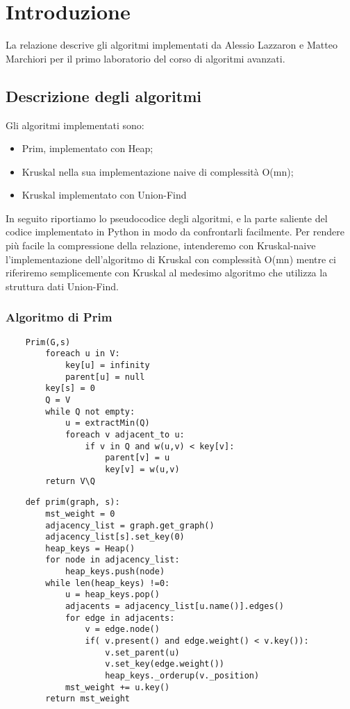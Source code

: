 \chapter{Introduzione\label{sec:introduzione}}
\noindent La relazione descrive gli algoritmi implementati da Alessio Lazzaron e Matteo Marchiori per il primo laboratorio del corso di algoritmi avanzati.

\section{Descrizione degli algoritmi\label{sec:descrizione}}
Gli algoritmi implementati sono:
\begin{itemize}
    \item Prim, implementato con Heap;
    \item Kruskal nella sua implementazione naive di complessità O(mn);
    \item Kruskal implementato con Union-Find
\end{itemize}

In seguito riportiamo lo pseudocodice degli algoritmi, e la parte saliente del codice implementato in Python in modo da confrontarli facilmente.
Per rendere più facile la compressione della relazione, intenderemo con Kruskal-naive l'implementazione dell'algoritmo di Kruskal con complessità O(mn) mentre ci riferiremo semplicemente con Kruskal al medesimo algoritmo che utilizza la struttura dati Union-Find.


\subsection{Algoritmo di Prim\label{sec:prim}}
\begin{verbatim}
    Prim(G,s)
        foreach u in V:
            key[u] = infinity
            parent[u] = null
        key[s] = 0
        Q = V
        while Q not empty:
            u = extractMin(Q)
            foreach v adjacent_to u:
                if v in Q and w(u,v) < key[v]:
                    parent[v] = u
                    key[v] = w(u,v)
        return V\Q
\end{verbatim}

\begin{verbatim}
    def prim(graph, s):
        mst_weight = 0
        adjacency_list = graph.get_graph()
        adjacency_list[s].set_key(0)
        heap_keys = Heap()
        for node in adjacency_list:
            heap_keys.push(node)
        while len(heap_keys) !=0:
            u = heap_keys.pop()
            adjacents = adjacency_list[u.name()].edges()
            for edge in adjacents:
                v = edge.node()
                if( v.present() and edge.weight() < v.key()):
                    v.set_parent(u)
                    v.set_key(edge.weight())
                    heap_keys._orderup(v._position)
            mst_weight += u.key()
        return mst_weight
\end{verbatim}


